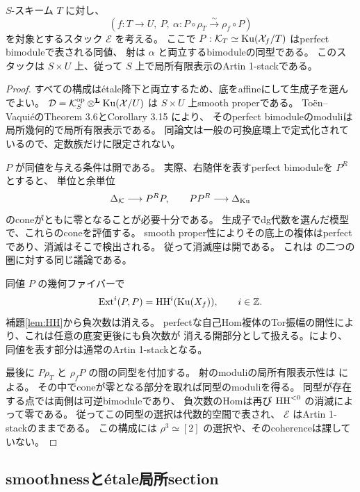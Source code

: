 \begin{proposition}\label{prop:equivalence-stack}
 \(S\)-スキーム \(T\) に対し、
 \[
 (f:T\to U,\ P,\ \alpha:P\circ\rho_T\xrightarrow{\sim}\rho_f\circ P)
 \]
 を対象とするスタック \(\mathcal E\) を考える。
 ここで \(P:\mathcal K_T\simeq\operatorname{Ku}(\mathcal X_f/T)\) はperfect bimoduleで表される同値、
 射は \(\alpha\) と両立するbimoduleの同型である。
 このスタックは \(S\times U\) 上、従って \(S\) 上で局所有限表示のArtin 1-stackである。
\end{proposition}
\begin{proof}
 すべての構成はétale降下と両立するため、底をaffineにして生成子を選んでよい。
 \(\mathcal D=\mathcal K_S^{\mathrm{op}}\mathbin{\otimes^{\mathbf L}}\operatorname{Ku}(\mathcal X/U)\) は \(S\times U\) 上smooth properである。
 Toën--VaquiéのTheorem 3.6とCorollary 3.15 \cite{TV}により、
 そのperfect bimoduleのmoduliは局所幾何的で局所有限表示である。
 同論文は一般の可換底環上で定式化されているので、定数族だけに限定されない。

 \(P\) が同値を与える条件は開である。
 実際、右随伴を表すperfect bimoduleを \(P^R\) とすると、
 単位と余単位
 \[
 \Delta_{\mathcal K}\longrightarrow P^R P,
 \qquad PP^R\longrightarrow\Delta_{\operatorname{Ku}}
 \]
 のconeがともに零となることが必要十分である。
 生成子でdg代数を選んだ模型で、これらのconeを評価する。
 smooth proper性によりその底上の複体はperfectであり、消滅はそこで検出される。
 従って消滅座は開である。
 これは \cite[Lemma 3.25とCorollary 3.24の証明]{TV} の二つの圏に対する同じ議論である。

 同値 \(P\) の幾何ファイバーで
 \[
 \operatorname{Ext}^i(P,P)=\operatorname{HH}^i(\operatorname{Ku}(X_f)),\qquad i\in\mathbb Z.
 \]
 補題\ref{lem:HH}から負次数は消える。
 perfectな自己Hom複体のTor振幅の開性により、これは任意の底変更後にも負次数が
 消える開部分として扱える。\cite[Corollary 3.21]{TV}により、
 同値を表す部分は通常のArtin 1-stackとなる。

 最後に \(P\rho_T\) と \(\rho_fP\) の間の同型を付加する。
 射のmoduliの局所有限表示性は \cite[Corollary 3.19]{TV} による。
 その中でconeが零となる部分を取れば同型のmoduliを得る。
 同型が存在する点では両側は可逆bimoduleであり、
 負次数のHomは再び \(\operatorname{HH}^{<0}\) の消滅によって零である。
 従ってこの同型の選択は代数的空間で表され、
 \(\mathcal E\) はArtin 1-stackのままである。
 この構成には \(\rho^3\simeq[2]\) の選択や、そのcoherenceは課していない。
\end{proof}

\subsection{smoothnessとétale局所section}


